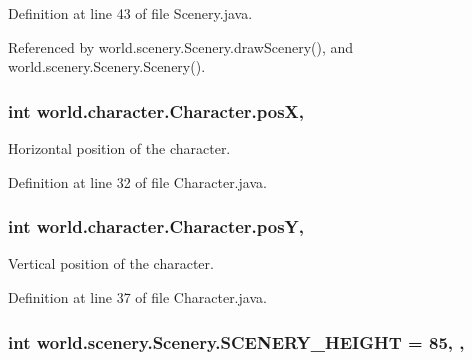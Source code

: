 Definition at line 43 of file Scenery.\-java.



Referenced by world.\-scenery.\-Scenery.\-draw\-Scenery(), and world.\-scenery.\-Scenery.\-Scenery().

\hypertarget{classworld_1_1character_1_1_character_a78ad3a5c111a39df2ba12b542fa175b4}{
\subsubsection[{pos\-X}]{\setlength{\rightskip}{0pt plus 5cm}int world.\-character.\-Character.\-pos\-X\hspace{0.3cm}{\ttfamily [protected]}, {\ttfamily [inherited]}}}\label{classworld_1_1character_1_1_character_a78ad3a5c111a39df2ba12b542fa175b4}


Horizontal position of the character. 



Definition at line 32 of file Character.\-java.

\hypertarget{classworld_1_1character_1_1_character_a1e81a73a02b73e6f1608ba3c1b6d83ef}{
\subsubsection[{pos\-Y}]{\setlength{\rightskip}{0pt plus 5cm}int world.\-character.\-Character.\-pos\-Y\hspace{0.3cm}{\ttfamily [protected]}, {\ttfamily [inherited]}}}\label{classworld_1_1character_1_1_character_a1e81a73a02b73e6f1608ba3c1b6d83ef}


Vertical position of the character. 



Definition at line 37 of file Character.\-java.

\hypertarget{classworld_1_1scenery_1_1_scenery_a106e53ae6e1647395740237ccce7f363}{
\subsubsection[{S\-C\-E\-N\-E\-R\-Y\-\_\-\-H\-E\-I\-G\-H\-T}]{\setlength{\rightskip}{0pt plus 5cm}int world.\-scenery.\-Scenery.\-S\-C\-E\-N\-E\-R\-Y\-\_\-\-H\-E\-I\-G\-H\-T = 85\hspace{0.3cm}{\ttfamily [static]}, {\ttfamily [protected]}, {\ttfamily [inherited]}}}\label{classworld_1_1scenery_1_1_scenery_a106e53ae6e1647395740237ccce7f363}


